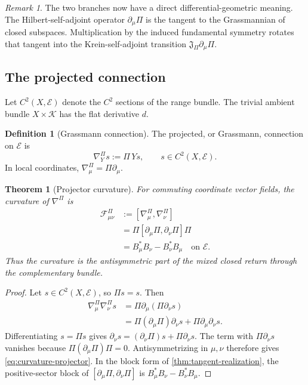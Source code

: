\documentclass[11pt,reqno]{scrartcl}
\newcommand{\scrK}{\mathscr K}
\newcommand{\fundJ}{\mathfrak J}
\newcommand{\gaugeF}{\mathcal F}
\theoremstyle{plain}
\newtheorem{theorem}{Theorem}[section]
\theoremstyle{definition}
\newtheorem{definition}[definition]{Definition}
\theoremstyle{remark}
\newtheorem{remark}[remark]{Remark}
\begin{document}
\begin{remark}
The two branches now have a direct differential-geometric meaning.  The
Hilbert-self-adjoint operator \(\partial_\mu\Pi\) is the tangent to the
Grassmannian of closed subspaces.  Multiplication by the induced fundamental
symmetry rotates that tangent into the Krein-self-adjoint transition
\(\fundJ_\Pi\partial_\mu\Pi\).
\end{remark}

\subsection{The projected connection}

Let \(C^2(X,\mathscr E)\) denote the \(C^2\) sections of the range bundle.
The trivial ambient bundle \(X\times\scrK\) has the flat derivative \(d\).

\begin{definition}[Grassmann connection]
\label{def:Grassmann-connection}
The projected, or Grassmann, connection on \(\mathscr E\) is
\begin{equation}
  \nabla^\Pi_Y s:=\Pi\,Y s,
  \qquad s\in C^2(X,\mathscr E).
  \label{eq:Grassmann-connection}
\end{equation}
In local coordinates, \(\nabla^\Pi_\mu=\Pi\partial_\mu\).
\end{definition}

\begin{theorem}[Projector curvature]
\label{thm:projector-curvature}
For commuting coordinate vector fields, the curvature of
\(\nabla^\Pi\) is
\begin{align}
  \gaugeF_{\mu\nu}^{\Pi}
  &:=[\nabla^\Pi_\mu,\nabla^\Pi_\nu]
  \label{eq:curvature-def}\\
  &=\Pi[\partial_\mu\Pi,\partial_\nu\Pi]\Pi
  \label{eq:curvature-projector}\\
  &=B_\mu^*B_\nu-B_\nu^*B_\mu
  \quad\text{on }\mathscr E.
  \label{eq:curvature-channel}
\end{align}
Thus the curvature is the antisymmetric part of the mixed closed return
through the complementary bundle.
\end{theorem}

\begin{proof}
Let \(s\in C^2(X,\mathscr E)\), so \(\Pi s=s\).  Then
\begin{align}
  \nabla^\Pi_\mu\nabla^\Pi_\nu s
  &=\Pi\partial_\mu(\Pi\partial_\nu s)\\
  &=\Pi(\partial_\mu\Pi)\partial_\nu s
    +\Pi\partial_\mu\partial_\nu s.
\end{align}
Differentiating \(s=\Pi s\) gives
\(\partial_\nu s=(\partial_\nu\Pi)s+\Pi\partial_\nu s\).  The term with
\(\Pi\partial_\nu s\) vanishes because
\(\Pi(\partial_\mu\Pi)\Pi=0\).  Antisymmetrizing in \(\mu,\nu\) therefore
gives \eqref{eq:curvature-projector}.  In the block form of
\cref{thm:tangent-realization}, the positive-sector block of
\([\partial_\mu\Pi,\partial_\nu\Pi]\) is
\(B_\mu^*B_\nu-B_\nu^*B_\mu\).
\end{proof}
\end{document}
